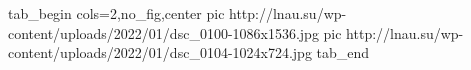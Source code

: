  
 
 
 
 


\ifcmt
  tab_begin cols=2,no_fig,center
     pic http://lnau.su/wp-content/uploads/2022/01/dsc_0100-1086x1536.jpg
		 pic http://lnau.su/wp-content/uploads/2022/01/dsc_0104-1024x724.jpg
  tab_end
\fi
